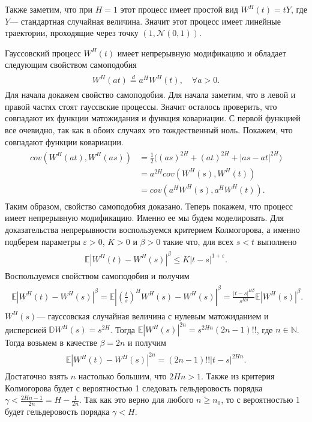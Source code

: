 \documentclass[a4paper,12pt]{article}
\numberwithin{equation}{section}
\newcommand{\N}{\mathbb N}
\newcommand{\W}{W^H}
\begin{document}
	Также заметим, что при $H=1$ этот процесс имеет простой вид $\W(t) = tY$, где $Y$--- стандартная случайная величина. Значит этот процесс имеет линейные траектории, проходящие через точку $(1, \mathcal{N}(0,1))$. 
	
	Гауссовский процесс $\W(t)$ имеет непрерывную модификацию и обладает следующим свойством самоподобия 
	\begin{align}
	\begin{split}\label{selfsimilarity}
	\W(at) \overset{d}{=} a^H\W(t), \quad \forall a>0.
	\end{split}
	\end{align}
	Для начала докажем свойство самоподобия. Для начала заметим, что в левой и правой частях стоят гауссвские процессы. Значит осталось проверить, что совпадают их функции матожидания и функция ковариации. С первой функцией все очевидно, так как в обоих случаях это тождественный ноль. Покажем, что совпадают функции ковариации. 
	\begin{align}
	\begin{split}
	cov(\W(at), \W(as)) &= \frac{1}{2}\bigr((as)^{2H}+(at)^{2H}+ |as-at|^{2H} \bigr)  \\ &= a^{2H} cov(\W(s), \W(t))  \\ &=  cov(a^H\W(s), a^H\W(t)). 
	\end{split}
	\end{align}
	Таким образом, свойство самоподобия доказано. Теперь покажем, что процесс имеет непрерывную модификацию. Именно ее мы будем моделировать. Для доказательства непрерывности воспользуемся критерием Колмогорова, а именно подберем параметры $\varepsilon>0$, $K>0$ и $\beta>0$ такие что, для всех $s<t$ выполнено 
	\begin{align}
	\begin{split}\label{Kolmogorov}
	\mathbb{E}|\W(t)-\W(s)|^{\beta} \leq K |t-s|^{1+\varepsilon}.
	\end{split}
	\end{align} 
	Воспользуемся свойством самоподобия и получим
	\begin{align}
	\begin{split}
	\mathbb{E}|\W(t)-\W(s)|^{\beta} = \mathbb{E}\left|\left(\frac{t}{s}\right)^H\W(s)-\W(s)\right|^{\beta} = \frac{|t-s|^{H\beta}}{s^{H\beta}}\mathbb{E}|\W(s)|^{\beta}. 
	\end{split}
	\end{align}
	$\W(s)$--- гауссовская случайная величина с нулевым матожиданием и дисперсией $\mathbb{D}\W(s) = s^{2H}$. Тогда $\mathbb{E}|\W(s)|^{2n} = s^{2Hn} (2n-1)!!$, где $n \in \N$. Тогда возьмем в качестве $\beta = 2n$ и получим 
	\begin{align}
	\begin{split}
	\mathbb{E}|\W(t)-\W(s)|^{2n} = (2n-1)!! |t-s|^{2Hn}. 
	\end{split}
	\end{align}
	Достаточно взять $n$ настолько большим, что $2Hn>1$. Также из критерия Колмогорова будет с вероятностью 1 следовать гельдеровость порядка $\gamma<\frac{2Hn-1}{2n} = H-\frac{1}{2n}$. Так как это верно для любого $n \geq n_0$, то с вероятностью 1 будет гельдеровость порядка $\gamma<H$. 
	
\end{document}
